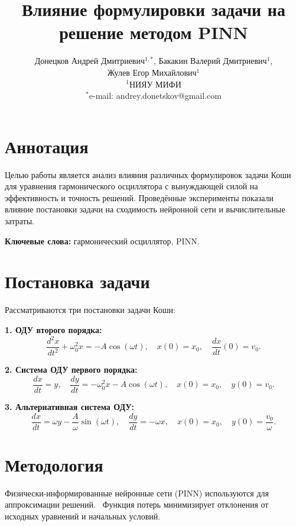 \documentclass[oneside, a5paper,10pt]{article}
\title{\textbf{Влияние формулировки задачи на решение методом PINN}}
\author{Донецков Андрей Дмитриевич$^{1,*}$, Бакакин Валерий Дмитриевич$^1$, \\ Жулев Егор Михайлович$^1$ \\
\small $^1$НИЯУ МИФИ\\
\small $^*$e-mail: andrey.donetskov@gmail.com}
\date{}
\begin{document}
\maketitle

\section*{Аннотация}
Целью работы является анализ влияния различных формулировок задачи Коши для уравнения гармонического осциллятора с вынуждающей силой на эффективность и точность решений. Проведённые эксперименты показали влияние постановки задачи на сходимость нейронной сети и вычислительные затраты.

\textbf{Ключевые слова:} гармонический осциллятор, PINN.

\section*{Постановка задачи}
Рассматриваются три постановки задачи Коши:

\textbf{1. ОДУ второго порядка:}
\begin{equation}
\frac{d^2x}{dt^2} + \omega_0^2 x = -A\cos(\omega t), \quad x(0) = x_0, \quad \frac{dx}{dt}(0) = v_0.
\end{equation}

\textbf{2. Система ОДУ первого порядка:}
\begin{equation}
\frac{dx}{dt} = y, \quad \frac{dy}{dt} = -\omega_0^2 x - A\cos(\omega t), \quad x(0) = x_0, \quad y(0) = v_0.
\end{equation}

\textbf{3. Альтернативная система ОДУ:}
\begin{equation}
\frac{dx}{dt} = \omega y - \frac{A}{\omega} \sin(\omega t), \quad \frac{dy}{dt} = -\omega x, \quad x(0) = x_0, \quad y(0) = \frac{v_0}{\omega}.
\end{equation}

\section*{Методология}
Физически-информированные нейронные сети (PINN) используются для аппроксимации решений.~\cite{raissi2019} Функция потерь минимизирует отклонения от исходных уравнений и начальных условий.~\cite{lagaris1998}
\end{document}
